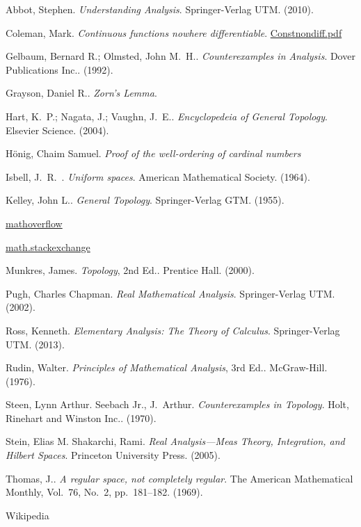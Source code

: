 \begin{thebibliography}{9}

Abbot, Stephen.  \textit{Understanding Analysis}.  Springer-Verlag UTM.  (2010).

Coleman, Mark.  \textit{Continuous functions nowhere differentiable}.  \href{http://www.maths.manchester.ac.uk/~mdc/MATH20101/notesPermanant/Contsnondiff.pdf}{Constnondiff.pdf}

Gelbaum, Bernard R.; Olmsted, John M.~H..  \textit{Counterexamples in Analysis}.  Dover Publications Inc..  (1992).

Grayson, Daniel R..  \textit{Zorn's Lemma}.

Hart, K.~P.; Nagata, J.; Vaughn, J.~E..  \textit{Encyclopedeia of General Topology}.  Elsevier Science.  (2004).

H\"{o}nig, Chaim Samuel.  \textit{Proof of the well-ordering of cardinal numbers}

Isbell, J.~R.~.  \textit{Uniform spaces}.  American Mathematical Society.  (1964).

Kelley, John L..  \textit{General Topology}.  Springer-Verlag GTM.  (1955).

\href{http://mathoverflow.net/}{mathoverflow}

\href{http://math.stackexchange.com/}{math.stackexchange}

Munkres, James.  \textit{Topology}, 2nd Ed..  Prentice Hall.  (2000).

Pugh, Charles Chapman.  \textit{Real Mathematical Analysis}.  Springer-Verlag UTM.  (2002).

Ross, Kenneth.  \textit{Elementary Analysis:  The Theory of Calculus}.  Springer-Verlag UTM.  (2013).

Rudin, Walter.  \textit{Principles of Mathematical Analysis}, 3rd Ed..  McGraw-Hill.  (1976).

Steen, Lynn Arthur.  Seebach Jr., J.~Arthur.  \textit{Counterexamples in Topology}.  Holt, Rinehart and Winston Inc..  (1970).

Stein, Elias M.  Shakarchi, Rami.  \textit{Real Analysis---Meas Theory, Integration, and Hilbert Spaces}.  Princeton University Press.  (2005).

Thomas, J..  \textit{A regular space, not completely regular}.  The American Mathematical Monthly, Vol.~76, No.~2, pp.~181--182.  (1969).

Wikipedia

\end{thebibliography}